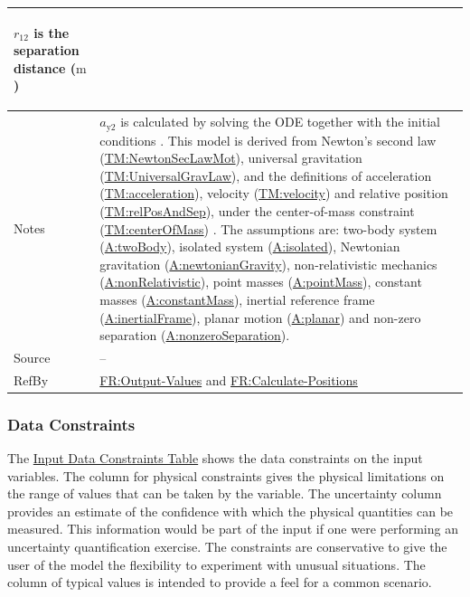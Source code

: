 \documentclass[12pt]{article}
\begin{document}
\begin{minipage}{\textwidth}
\begin{tabular}{>{\raggedright}p{}>{\raggedright\arraybackslash}p{}}
\begin{symbDescription}
              \item{${r_{12}}$ is the separation distance (${\text{m}}$)}
              \end{symbDescription}
\\ \midrule
Notes & ${a_{\text{y}2}}$ is calculated by solving the ODE together with the initial conditions . This model is derived from Newton's second law (\hyperref[TM:NewtonSecLawMot]{TM:NewtonSecLawMot}), universal gravitation (\hyperref[TM:UniversalGravLaw]{TM:UniversalGravLaw}), and the definitions of acceleration (\hyperref[TM:acceleration]{TM:acceleration}), velocity (\hyperref[TM:velocity]{TM:velocity}) and relative position (\hyperref[TM:relPosAndSep]{TM:relPosAndSep}), under the center-of-mass constraint (\hyperref[TM:centerOfMass]{TM:centerOfMass}) . The assumptions are: two-body system (\hyperref[twoBody]{A:twoBody}), isolated system (\hyperref[isolated]{A:isolated}), Newtonian gravitation (\hyperref[newtonianGravity]{A:newtonianGravity}), non-relativistic mechanics (\hyperref[nonRelativistic]{A:nonRelativistic}), point masses (\hyperref[pointMass]{A:pointMass}), constant masses (\hyperref[constantMass]{A:constantMass}), inertial reference frame (\hyperref[inertialFrame]{A:inertialFrame}), planar motion (\hyperref[planar]{A:planar}) and non-zero separation (\hyperref[nonzeroSeparation]{A:nonzeroSeparation}).
        
\\ \midrule
Source & --
         
\\ \midrule
RefBy & \hyperref[outputValues]{FR:Output-Values} and \hyperref[calcPositions]{FR:Calculate-Positions}
        
\\ \bottomrule
\end{tabular}
\end{minipage}

\subsubsection{Data Constraints}
\label{Sec:DataConstraints}
The \hyperref[Table:InDataConstraints]{Input Data Constraints Table} shows the data constraints on the input variables. The column for physical constraints gives the physical limitations on the range of values that can be taken by the variable. The uncertainty column provides an estimate of the confidence with which the physical quantities can be measured. This information would be part of the input if one were performing an uncertainty quantification exercise. The constraints are conservative to give the user of the model the flexibility to experiment with unusual situations. The column of typical values is intended to provide a feel for a common scenario.
\end{document}
